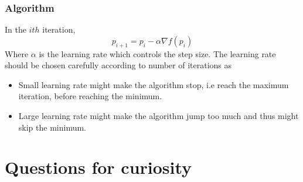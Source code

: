 \subsubsection{Algorithm}

In the $ith$ iteration, 
\begin{equation}
    p_{i+1} = p_{i} - \alpha \nabla f(p_{i})
\end{equation}
Where $\alpha$ is the learning rate which controls the step size. The learning rate should be chosen
carefully according to number of iterations as
\begin{itemize}
    \item Small learning rate might make the algorithm stop, i.e reach the maximum iteration, before
    reaching the minimum.
    \item Large learning rate might make the algorithm jump too much and thus might skip the minimum.
\end{itemize}

\section{Questions for curiosity}